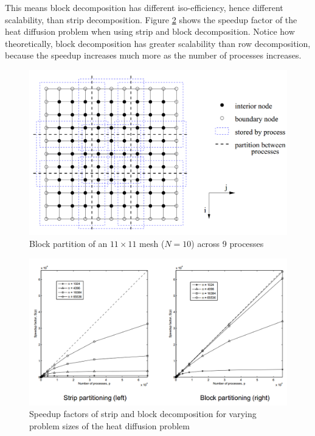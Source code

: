 \documentclass{article}
\begin{document}
This means block decomposition has different iso-efficiency, hence different scalability, than strip decomposition. Figure \ref{fig:row-block-heat-diffusion-speedup} shows the speedup factor of the heat diffusion problem when using strip and block decomposition. Notice how theoretically, block decomposition has greater scalability than row decomposition, because the speedup increases much more as the number of processes increases.

\begin{figure}
	\centering
	\includegraphics[scale=0.4]{figures/block-decomposition.png}
	\caption{Block partition of an $11 \times 11$ mesh ($N = 10$) across 9 processes}
	\label{fig:block-decomposition}
\end{figure}

\begin{figure}
	\centering
	\includegraphics[scale=0.6]{figures/strip-block-speedup.png}
	\caption{Speedup factors of strip and block decomposition for varying problem sizes of the heat diffusion problem}
	\label{fig:row-block-heat-diffusion-speedup}
\end{figure}
\end{document}
